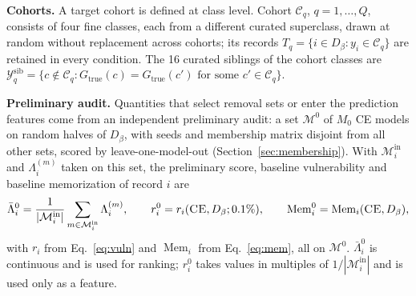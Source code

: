 \documentclass{article} %
\newcommand{\cn}[1]{\textsc{#1}}
\newcommand{\Gtrue}{G_{\mathrm{true}}}
\newcommand{\Mem}{\operatorname{Mem}}
\newcommand{\inset}{\mathcal{M}^{\mathrm{in}}}
\begin{document}
\textbf{Cohorts.} A target cohort is defined at class level. Cohort $\mathcal{C}_q$, $q=1,\ldots,Q$, consists of four fine classes, each from a different curated superclass, drawn at random without replacement across cohorts; its records $T_q=\{i\in D_\beta:y_i\in\mathcal{C}_q\}$ are retained in every condition. The 16 curated siblings of the cohort classes are $\mathcal{Y}_q^{\mathrm{sib}}=\{c\notin\mathcal{C}_q:\Gtrue(c)=\Gtrue(c')\text{ for some }c'\in\mathcal{C}_q\}$.

\textbf{Preliminary audit.} Quantities that select removal sets or enter the prediction features come from an independent preliminary audit: a set $\mathcal{M}^0$ of $M_0$ \cn{CE} models on random halves of $D_\beta$, with seeds and membership matrix disjoint from all other sets, scored by leave-one-model-out (Section~\ref{sec:membership}). With $\inset_i$ and $\Lambda_i^{(m)}$ taken on this set, the preliminary score, baseline vulnerability and baseline memorization of record $i$ are
\begin{equation}
\bar\Lambda_i^0=\frac{1}{|\inset_i|}\sum_{m\in\inset_i}\Lambda_i^{(m)},\qquad
r_i^0=r_i(\cn{CE},D_\beta;0.1\%),\qquad
\Mem_i^0=\Mem_i(\cn{CE},D_\beta),
\label{eq:lambda0}
\end{equation}
with $r_i$ from Eq.~\ref{eq:vuln} and $\Mem_i$ from Eq.~\ref{eq:mem}, all on $\mathcal{M}^0$. $\bar\Lambda_i^0$ is continuous and is used for ranking; $r_i^0$ takes values in multiples of $1/|\inset_i|$ and is used only as a feature.
\end{document}
